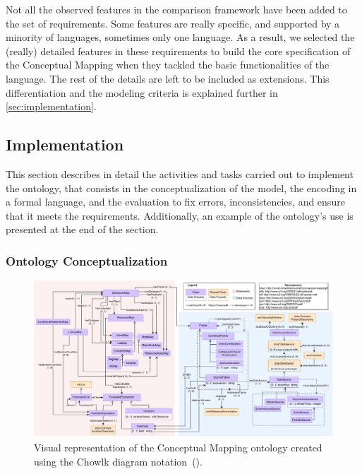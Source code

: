 Not all the observed features in the comparison framework have been added to the set of requirements. Some features are really specific, and supported by a minority of languages, sometimes only one language. As a result, we selected the (really) detailed features in these requirements to build the core specification of the Conceptual Mapping when they tackled the basic functionalities of the language. The rest of the details are left to be included as extensions. This differentiation and the modeling criteria is explained further in \cref{sec:implementation}.










\subsection{Implementation}
\label{sec:chp4_implementation}

This section describes in detail the activities and tasks carried out to implement the ontology, that consists in the conceptualization of the model, the encoding in a formal language, and the evaluation to fix errors, inconsistencies, and ensure that it meets the requirements. Additionally, an example of the ontology's use is presented at the end of the section.



\subsubsection{Ontology Conceptualization}




\begin{figure}
    \centering
    \includegraphics[width=1\linewidth]{figures/cm_diagram}
    \caption{Visual representation of the Conceptual Mapping ontology created using the Chowlk diagram notation~(\cite{feria2021chowlk}).}
    \label{fig:cm_diagram}
\end{figure}

